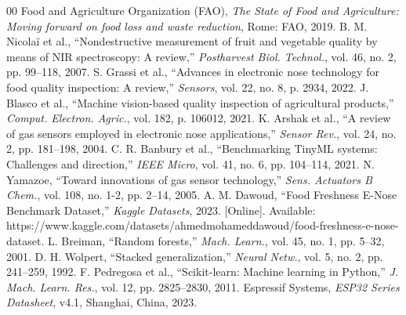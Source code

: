 \documentclass[conference]{IEEEtran}
\begin{document}
\begin{thebibliography}{00}
 Food and Agriculture Organization (FAO), \textit{The State of Food and Agriculture: Moving forward on food loss and waste reduction}, Rome: FAO, 2019.
 B. M. Nicolaï et al., ``Nondestructive measurement of fruit and vegetable quality by means of NIR spectroscopy: A review,'' \textit{Postharvest Biol. Technol.}, vol. 46, no. 2, pp. 99--118, 2007.
 S. Grassi et al., ``Advances in electronic nose technology for food quality inspection: A review,'' \textit{Sensors}, vol. 22, no. 8, p. 2934, 2022.
 J. Blasco et al., ``Machine vision-based quality inspection of agricultural products,'' \textit{Comput. Electron. Agric.}, vol. 182, p. 106012, 2021.
 K. Arshak et al., ``A review of gas sensors employed in electronic nose applications,'' \textit{Sensor Rev.}, vol. 24, no. 2, pp. 181--198, 2004.
 C. R. Banbury et al., ``Benchmarking TinyML systems: Challenges and direction,'' \textit{IEEE Micro}, vol. 41, no. 6, pp. 104--114, 2021.
 N. Yamazoe, ``Toward innovations of gas sensor technology,'' \textit{Sens. Actuators B Chem.}, vol. 108, no. 1-2, pp. 2--14, 2005.
 A. M. Dawoud, ``Food Freshness E-Nose Benchmark Dataset,'' \textit{Kaggle Datasets}, 2023. [Online]. Available: https://www.kaggle.com/datasets/ahmedmohameddawoud/food-freshness-e-nose-dataset.
 L. Breiman, ``Random forests,'' \textit{Mach. Learn.}, vol. 45, no. 1, pp. 5--32, 2001.
 D. H. Wolpert, ``Stacked generalization,'' \textit{Neural Netw.}, vol. 5, no. 2, pp. 241--259, 1992.
 F. Pedregosa et al., ``Scikit-learn: Machine learning in Python,'' \textit{J. Mach. Learn. Res.}, vol. 12, pp. 2825--2830, 2011.
 Espressif Systems, \textit{ESP32 Series Datasheet}, v4.1, Shanghai, China, 2023.
\end{thebibliography}
\end{document}
